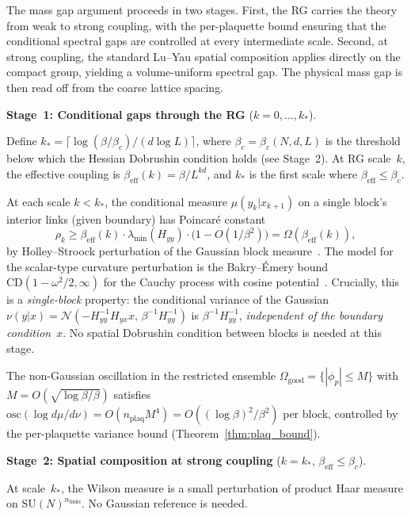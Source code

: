 \documentclass[11pt]{article}
\theoremstyle{definition}
\begin{document}
The mass gap argument proceeds in two stages.  First, the RG 
carries the theory from weak to strong coupling, with the 
per-plaquette bound ensuring that the conditional spectral gaps 
are controlled at every intermediate scale.  Second, at strong 
coupling, the standard Lu--Yau spatial composition applies 
directly on the compact group, yielding a volume-uniform spectral 
gap.  The physical mass gap is then read off from the coarse 
lattice spacing.

\medskip
\textbf{Stage~1: Conditional gaps through the RG} 
($k = 0, \ldots, k_*$).

Define $k_* = \lceil \log(\beta/\beta_c) / (d \log L) \rceil$, 
where $\beta_c = \beta_c(N,d,L)$ is the threshold below which 
the Hessian Dobrushin condition holds (see Stage~2).  
At RG scale~$k$, the effective coupling is 
$\beta_{\mathrm{eff}}(k) = \beta/L^{kd}$, and $k_*$ is the 
first scale where $\beta_{\mathrm{eff}} \leq \beta_c$.

At each scale $k < k_*$, the conditional measure $\mu(y_k | x_{k+1})$ 
on a single block's interior links (given boundary) has Poincar\'e 
constant
\begin{equation}\label{eq:cond_gap}
  \rho_k \geq \beta_{\mathrm{eff}}(k) \cdot \lambda_{\min}(H_{yy}) 
  \cdot \bigl(1 - O(1/\beta^2)\bigr) = \Omega(\beta_{\mathrm{eff}}(k)),
\end{equation}
by Holley--Stroock perturbation of the Gaussian block 
measure~\cite{BGL}.  The model for the scalar-type curvature 
perturbation is the Bakry--\'Emery bound 
$\mathrm{CD}(1-\omega^2/2,\infty)$ for the Cauchy process with 
cosine potential~\cite{Fontes2026_BE}.  Crucially, this is a 
\emph{single-block} property: the conditional variance of the 
Gaussian $\nu(y|x) = \mathcal{N}(-H_{yy}^{-1}H_{yx}x,\, 
\beta^{-1}H_{yy}^{-1})$ is $\beta^{-1}H_{yy}^{-1}$, 
\emph{independent of the boundary condition}~$x$.  No spatial 
Dobrushin condition between blocks is needed at this stage.

The non-Gaussian oscillation in the restricted ensemble 
$\Omega_{\mathrm{good}} = \{|\phi_p| \leq M\}$ with 
$M = O(\sqrt{\log\beta/\beta})$ satisfies 
$\mathrm{osc}(\log d\mu/d\nu) = O(n_{\mathrm{plaq}} M^4) 
= O((\log\beta)^2/\beta^2)$ per block, controlled by the 
per-plaquette variance bound (Theorem~\ref{thm:plaq_bound}).

\medskip
\textbf{Stage~2: Spatial composition at strong coupling} 
($k = k_*$, $\beta_{\mathrm{eff}} \leq \beta_c$).

At scale~$k_*$, the Wilson measure is a small perturbation of 
product Haar measure on $\mathrm{SU}(N)^{n_{\mathrm{links}}}$.  
No Gaussian reference is needed.
\end{document}
